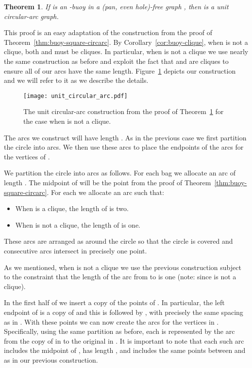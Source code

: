 \documentclass[11pt,a4paper]{article}
\newtheorem{theorem} {Theorem}[section]
\newenvironment{proof}{\noindent {\it Proof:~}}{\hfill \smallskip\par}
\begin{document}
\begin{theorem}\label{thm:buoy-unit-circ}
If  is an -buoy in a (pan, even hole)-free graph ,
then  is a unit circular-arc graph.
\end{theorem}
\begin{proof}
This proof is an easy adaptation of the construction from the
proof of Theorem~\ref{thm:buoy-square-circarc}.
By Corollary~\ref{cor:buoy-clique}, when  is
not a clique, both  and  must be cliques. In particular, when 
is not a clique we use nearly the same construction as
before and exploit the fact that  and  are cliques to ensure all of our arcs have the
same length. Figure~\ref{fig:unit_circular_arc} depicts our
construction and we will refer to it as we describe the
details.

\begin{figure}[h]
\centering
\texttt{[image: unit\_circular\_arc.pdf]}
\caption{The unit circular-arc construction from the proof of
Theorem~\ref{thm:buoy-unit-circ} for the case when  is not a clique.} \label{fig:unit_circular_arc}
\end{figure}

The arcs we construct will have length . As in the
previous case we first partition the circle into arcs. We then
use these arcs to place the endpoints of the arcs for the
vertices of .

We partition the circle into arcs as follows. For each bag
 we allocate an arc  of length . The
midpoint of  will be the point  from
the proof of Theorem~\ref{thm:buoy-square-circarc}.
For each  we allocate an arc  such that:
\begin{itemize}
\item When  is a clique, the length of  is two.
\item When  is not a clique, the length of  is one.
\end{itemize}
These arcs are arranged as  around the circle so that the circle
is covered and consecutive arcs intersect in precisely one
point.

As we mentioned, when  is not a clique we
use the previous construction subject to the constraint that
the length of the arc from  to  is one (note:
 since  is not a clique).

In the first half of  we insert a copy of the points
of .
In particular, the left endpoint of  is a copy of
 and this is followed by ,
 with precisely the same spacing as in .
With these points we can now create the arcs for the vertices
in . Specifically, using the same partition  as
before, each  is represented by the arc
from the copy of  in  to the original 
in . It is important to note that each such arc
includes the midpoint of , has length ,
and includes the same points between  and  as in
our previous construction.


\end{proof}
\end{document}

